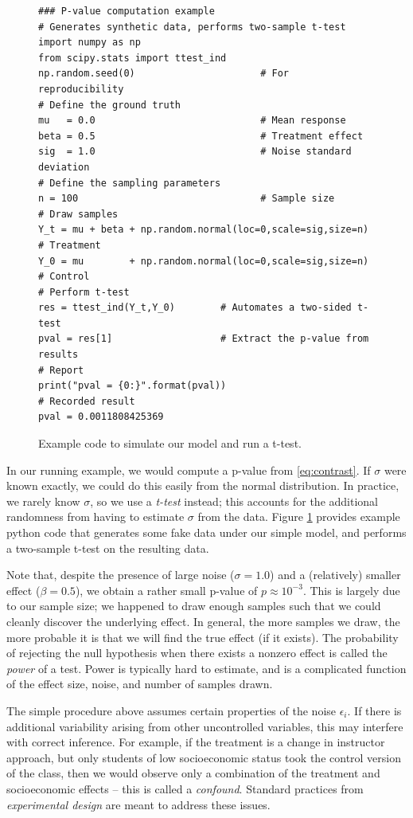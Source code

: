 \documentclass{tufte-handout}
\begin{document}
\begin{figure}[!ht]
\begin{verbatim}
### P-value computation example
# Generates synthetic data, performs two-sample t-test
import numpy as np
from scipy.stats import ttest_ind
np.random.seed(0)                      # For reproducibility
# Define the ground truth
mu   = 0.0                             # Mean response
beta = 0.5                             # Treatment effect
sig  = 1.0                             # Noise standard deviation
# Define the sampling parameters
n = 100                                # Sample size
# Draw samples
Y_t = mu + beta + np.random.normal(loc=0,scale=sig,size=n) # Treatment
Y_0 = mu        + np.random.normal(loc=0,scale=sig,size=n) # Control
# Perform t-test
res = ttest_ind(Y_t,Y_0)        # Automates a two-sided t-test
pval = res[1]                   # Extract the p-value from results
# Report
print("pval = {0:}".format(pval))
# Recorded result
pval = 0.0011808425369
\end{verbatim}
\caption{Example code to simulate our model and run a t-test.}
\label{fig:p-value-computation}
\end{figure}

In our running example, we would compute a p-value from \eqref{eq:contrast}. If
\(\sigma\) were known exactly, we could do this easily from the normal
distribution. In practice, we rarely know \(\sigma\), so we use a \emph{t-test}
instead; this accounts for the additional randomness from having to estimate
\(\sigma\) from the data. Figure \ref{fig:p-value-computation} provides example
python code that generates some fake data under our simple model, and performs a
two-sample t-test on the resulting data.

Note that, despite the presence of large noise (\(\sigma=1.0\)) and a (relatively)
smaller effect (\(\beta=0.5\)), we obtain a rather small p-value of
\(p\approx10^{-3}\). This is largely due to our sample size; we happened to draw
enough samples such that we could cleanly discover the underlying effect. In
general, the more samples we draw, the more probable it is that we will find the
true effect (if it exists). The probability of rejecting the null hypothesis
when there exists a nonzero effect is called the \emph{power} of a test. Power is
typically hard to estimate, and is a complicated function of the effect size,
noise, and number of samples drawn.

The simple procedure above assumes certain properties of the noise \(\epsilon_i\).
If there is additional variability arising from other uncontrolled variables,
this may interfere with correct inference. For example, if the treatment is a
change in instructor approach, but only students of low socioeconomic status
took the control version of the class, then we would observe only a combination
of the treatment and socioeconomic effects -- this is called a \emph{confound}.
Standard practices from \emph{experimental design} are meant to address these issues.
\end{document}
